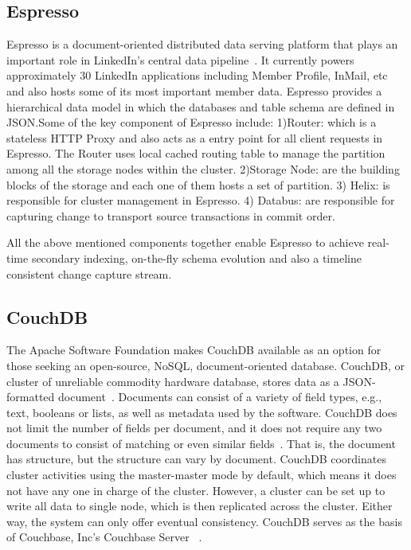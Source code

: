 \subsection{Espresso}

Espresso is a document-oriented distributed data serving platform that
plays an important role in LinkedIn's central data
pipeline~\cite{www-Linkedin-Espresso}.  It currently powers
approximately 30 LinkedIn applications including Member Profile,
InMail, etc and also hosts some of its most important member
data. Espresso provides a hierarchical data model in which the
databases and table schema are defined in JSON.Some of the key
component of Espresso include: 1)Router: which is a stateless HTTP
Proxy and also acts as a entry point for all client requests in
Espresso. The Router uses local cached routing table to manage the
partition among all the storage nodes within the cluster. 2)Storage
Node: are the building blocks of the storage and each one of them
hosts a set of partition. 3) Helix: is responsible for cluster
management in Espresso. 4) Databus: are responsible for capturing
change to transport source transactions in commit order.

     All the above mentioned components together enable Espresso to achieve 
     real-time secondary indexing, on-the-fly schema evolution and also a 
     timeline consistent change capture stream.

     \pv

\subsection{CouchDB \cv}
     
The Apache Software Foundation makes CouchDB available as an option
for those seeking an open-source, NoSQL, document-oriented
database. CouchDB, or cluster of unreliable commodity hardware
database, stores data as a JSON-formatted
document~\cite{www-exploringcdb-couchdb}.  Documents can consist of a
variety of field types, e.g., text, booleans or lists, as well as
metadata used by the software. CouchDB does not limit the number of
fields per document, and it does not require any two documents to
consist of matching or even similar
fields~\cite{www-techoverview-couchdb}. That is, the document has
structure, but the structure can vary by document.  CouchDB
coordinates cluster activities using the master-master mode by
default, which means it does not have any one in charge of the
cluster.  However, a cluster can be set up to write all data to single
node, which is then replicated across the cluster.  Either way, the
system can only offer eventual consistency. CouchDB serves as the
basis of Couchbase, Inc's Couchbase Server
~\cite{www-cdb-vs-cbs-couchdb}.

